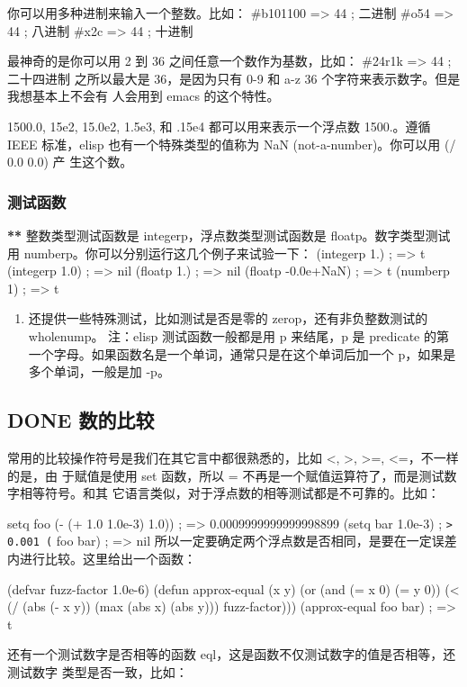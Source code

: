 \documentclass[11pt]{ctexart}
\begin{document}
你可以用多种进制来输入一个整数。比如：
\#b101100 => 44      ; 二进制
\#o54 => 44          ; 八进制
\#x2c => 44          ; 十进制

最神奇的是你可以用 2 到 36 之间任意一个数作为基数，比如：
\#24r1k => 44        ; 二十四进制
之所以最大是 36，是因为只有 0-9 和 a-z 36 个字符来表示数字。但是我想基本上不会有
人会用到 emacs 的这个特性。

1500.0, 15e2, 15.0e2, 1.5e3, 和 .15e4 都可以用来表示一个浮点数 1500.。遵循 IEEE
标准，elisp 也有一个特殊类型的值称为 NaN (not-a-number)。你可以用 (/ 0.0 0.0) 产
生这个数。

\subsubsection{测试函数}
\label{sec:org9097ace}

\textbf{\textbf{**}} 整数类型测试函数是 integerp，浮点数类型测试函数是 floatp。数字类型测试用 numberp。你可以分别运行这几个例子来试验一下：
(integerp 1.)                           ; => t
(integerp 1.0)                          ; => nil
(floatp 1.)                             ; => nil
(floatp -0.0e+NaN)                      ; => t
(numberp 1)                             ; => t
\begin{enumerate}
\item 还提供一些特殊测试，比如测试是否是零的 zerop，还有非负整数测试的 wholenump。
\label{sec:orgd2d60f2}
注：elisp 测试函数一般都是用 p 来结尾，p 是 predicate 的第一个字母。如果函数名是一个单词，通常只是在这个单词后加一个 p，如果是多个单词，一般是加 -p。
\end{enumerate}
\subsection{{\bfseries\sffamily DONE} 数的比较}
\label{sec:orgb92db8c}
常用的比较操作符号是我们在其它言中都很熟悉的，比如 <, >, >=, <=，不一样的是，由
于赋值是使用 set 函数，所以 = 不再是一个赋值运算符了，而是测试数字相等符号。和其
它语言类似，对于浮点数的相等测试都是不可靠的。比如：

setq foo (- (+ 1.0 1.0e-3) 1.0))       ; => 0.0009999999999998899
(setq bar 1.0e-3)                       ; \texttt{> 0.001
    (} foo bar)                             ; => nil
所以一定要确定两个浮点数是否相同，是要在一定误差内进行比较。这里给出一个函数：
\begin{SCR}
(defvar fuzz-factor 1.0e-6)
(defun approx-equal (x y)
(or (and (= x 0) (= y 0))
(< (/ (abs (- x y))
(max (abs x) (abs y)))
fuzz-factor)))
(approx-equal foo bar)                  ; => t
\end{SCR}
还有一个测试数字是否相等的函数 eql，这是函数不仅测试数字的值是否相等，还测试数字
类型是否一致，比如：
\end{document}
